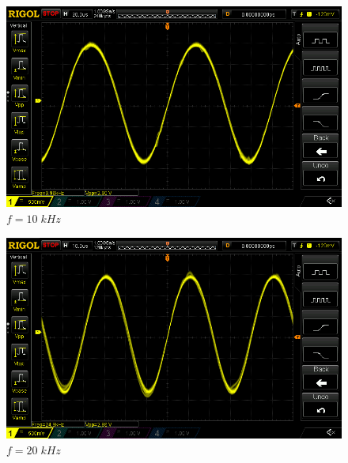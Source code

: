\documentclass[uplatex,a4paper,11pt,oneside,openany]{jsbook}
\begin{document}
\begin{spacing}{0.67}
  \begin{multicols}{2}
    \begin{figure}[H]
       \centering
        \includegraphics[keepaspectratio, scale=0.28, angle=0]
                    {rigol/figs/FrqCharM1Y1_2kR/10khz.png}
                    \caption{$f=10\;kHz$}
                    \label{fig:frq10k}
    \end{figure}
  
    \begin{figure}[H]
       \centering
        \includegraphics[keepaspectratio, scale=0.28, angle=0]
                  {rigol/figs/FrqCharM1Y1_2kR/20khz.png}
                  \caption{$f=20\;kHz$}
                  \label{fig:frq20k}
    \end{figure}
  \end{multicols}


\end{spacing}
\end{document}

